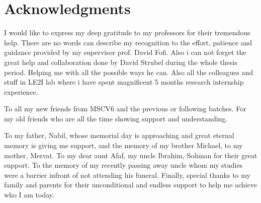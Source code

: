 \doublespacing

\setcounter{page}{1} \pagestyle{plain}


\tableofcontents

\listoffigures
\listoftables
\clearpage




\chapter*{Acknowledgments}

         {\protect{}}
I would like to express my deep gratitude to my professors for their tremendous help.  There are no words can describe my recognition to the effort, patience and guidance provided by my supervisor prof. David Fofi. Also i can not forget the great help and collaboration done by David Strubel during the whole thesis period. Helping me with all the possible ways he can. Also all the colleagues and stuff in LE2I lab where i have spent magnificent 5 months research internship experience. 

 To all my new friends from MSCV6 and the previous or following batches.  For my old friends who are all the time showing support and understanding. 

To my father, Nabil, whose memorial day is approaching and great eternal memory is giving me support, and the memory of my brother Michael, to my mother, Mervat. To my dear aunt Afaf, my uncle Ibrahim, Soliman for their great support. To the memory of my recently passing away uncle whom my studies were a barrier infront of not attending his funeral. Finally, special thanks to my family and parents for their unconditional and endless support to help me achieve who I am today.
\pagestyle{fancy}
